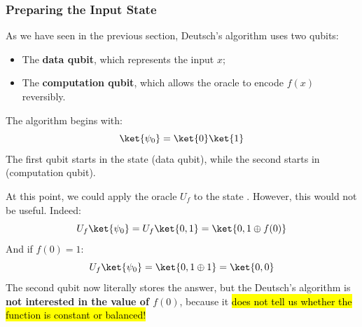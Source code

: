 \subsubsection{Preparing the Input State}\label{ex:preparing-the-input-state}

As we have seen in the previous section, Deutsch's algorithm uses two qubits:
\begin{itemize}
    \item The \textbf{data qubit}, which represents the input $x$;
    \item The \textbf{computation qubit}, which allows the oracle to encode $f(x)$ reversibly.
\end{itemize}
The algorithm begins with:
\begin{equation*}
    \ket{\psi_0} = \ket{0}\ket{1}
\end{equation*}
The first qubit starts in the state  (data qubit), while the second starts in  (computation qubit).

\highspace
\textcolor{Red2}{} At this point, we could apply the oracle $U_f$ to the state . However, this would not be useful. Indeed:
\begin{equation*}
    U_f \ket{\psi_0} = U_f \ket{0, 1} = \ket{0, 1 \oplus f(0)}
\end{equation*}
And if $f(0) = 1$:
\begin{equation*}
    U_f \ket{\psi_0} = \ket{0, 1 \oplus 1} = \ket{0, 0}
\end{equation*}
The second qubit now literally stores the answer, but the Deutsch's algorithm is \textbf{not interested in the value of $f(0)$}, because it \hl{does not tell us whether the function is constant or balanced!}

